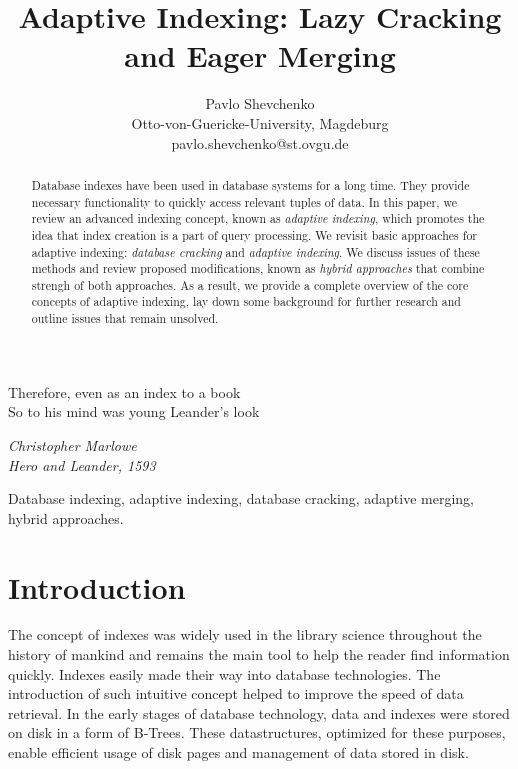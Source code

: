 \documentclass[10pt, conference, compsocconf]{IEEEtran}
\begin{document}
\title{Adaptive Indexing: Lazy Cracking and Eager Merging}
\author{Pavlo Shevchenko \\ Otto-von-Guericke-University, Magdeburg \\ pavlo.shevchenko@st.ovgu.de}

\maketitle

\epigraph{Therefore, even as an index to a book \\
So to his mind was young Leander's look}{\textit{Christopher Marlowe\\Hero and Leander, 1593}}

\begin{abstract}
Database indexes have been used in database systems for a long time. They provide necessary functionality to quickly access relevant tuples of data. In this paper, we review an advanced indexing concept, known as \emph{adaptive indexing}, which promotes the idea that index creation is a part of query processing. We revisit basic approaches for adaptive indexing: \emph{database cracking} and \emph{adaptive indexing}. We discuss issues of these methods and review proposed modifications, known as \emph{hybrid approaches} that combine strengh of both approaches. As a result, we provide a complete overview of the core concepts of adaptive indexing, lay down some background for further research and outline issues that remain unsolved.\\
\end{abstract}

\begin{IEEEkeywords}
Database indexing, adaptive indexing, database cracking, adaptive merging, hybrid approaches.
\end{IEEEkeywords}

\section{Introduction}
The concept of indexes was widely used in the library science throughout the history of mankind and remains the main tool to help the reader find information quickly. Indexes easily made their way into database technologies. The introduction of such intuitive concept helped to improve the speed of data retrieval. In the early stages of database technology, data and indexes were stored on disk in a form of B-Trees. These datastructures, optimized for these purposes, enable efficient usage of disk pages and management of data stored in disk.
\end{document}

